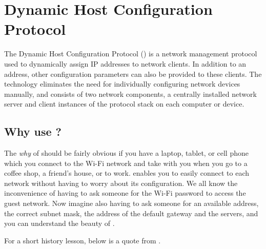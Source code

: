 \chapter{Dynamic Host Configuration Protocol}
\label{chap:dhcp}

The Dynamic Host Configuration Protocol () is a network management protocol used to dynamically assign IP addresses to network clients.
In addition to an  address, other configuration parameters can also be provided to these clients.
The technology eliminates the need for individually configuring network devices manually, and consists of two network components, a centrally installed network  server and client instances of the protocol stack on each computer or device.



\section{Why use ?}

The \emph{why} of  should be fairly obvious if you have a laptop, tablet, or cell phone which you connect to the Wi-Fi network and take with you when you go to a coffee shop, a friend's house, or to work.
 enables you to easily connect to each network without having to worry about its  configuration.
We all know the inconvenience of having to ask someone for the Wi-Fi password to access the guest network.
Now imagine also having to ask someone for an available  address, the correct subnet mask, the  address of the default gateway and the  servers, and you can understand the beauty of .

For a short history lesson, below is a quote from \cite[3-5]{droms02}.

